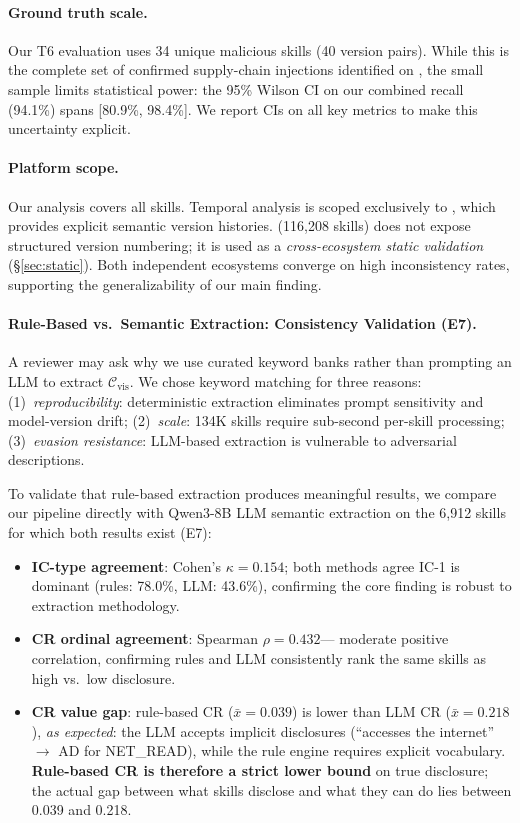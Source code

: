 \paragraph{Ground truth scale.}
Our T6 evaluation uses 34 unique malicious skills (40 version pairs).
While this is the complete set of confirmed supply-chain injections
identified on \clawhub{}, the small sample limits statistical power:
the 95\% Wilson CI on our combined recall (94.1\%) spans
[80.9\%, 98.4\%]. We report CIs on all key metrics
to make this uncertainty explicit.

\paragraph{Platform scope.}
Our \clawhub{} analysis covers all \NskillsDMR{} skills.
Temporal analysis is scoped exclusively to \clawhub{}, which provides
explicit semantic version histories.
\skillssh{} (116,208 skills) does not expose structured version numbering;
it is used as a \emph{cross-ecosystem static validation} (\S\ref{sec:static}).
Both independent ecosystems converge on high inconsistency rates,
supporting the generalizability of our main finding.

\paragraph{Rule-Based vs.\ Semantic Extraction: Consistency Validation (E7).}
A reviewer may ask why we use curated keyword banks
rather than prompting an LLM to extract $\mathcal{C}_{\text{vis}}$.
We chose keyword matching for three reasons:
(1)~\emph{reproducibility}: deterministic extraction eliminates
prompt sensitivity and model-version drift;
(2)~\emph{scale}: 134K skills require sub-second per-skill processing;
(3)~\emph{evasion resistance}: LLM-based extraction
is vulnerable to adversarial descriptions.

To validate that rule-based extraction produces meaningful results,
we compare our pipeline directly with Qwen3-8B LLM semantic extraction
on the 6,912 skills for which both results exist (E7):

\begin{itemize}[topsep=2pt,itemsep=1pt]
\item \textbf{IC-type agreement}: Cohen's $\kappa = 0.154$;
  both methods agree IC-1 is dominant (rules: 78.0\%, LLM: 43.6\%),
  confirming the core finding is robust to extraction methodology.
\item \textbf{CR ordinal agreement}: Spearman $\rho = 0.432$---
  moderate positive correlation, confirming rules and LLM
  consistently rank the same skills as high vs.\ low disclosure.
\item \textbf{CR value gap}: rule-based CR ($\bar{x}=0.039$) is lower than
  LLM CR ($\bar{x}=0.218$), \emph{as expected}: the LLM accepts
  implicit disclosures (``accesses the internet'' $\to$ AD for NET\_READ),
  while the rule engine requires explicit vocabulary.
  \textbf{Rule-based CR is therefore a strict lower bound}
  on true disclosure; the actual gap between what skills disclose
  and what they can do lies between 0.039 and 0.218.
\end{itemize}

